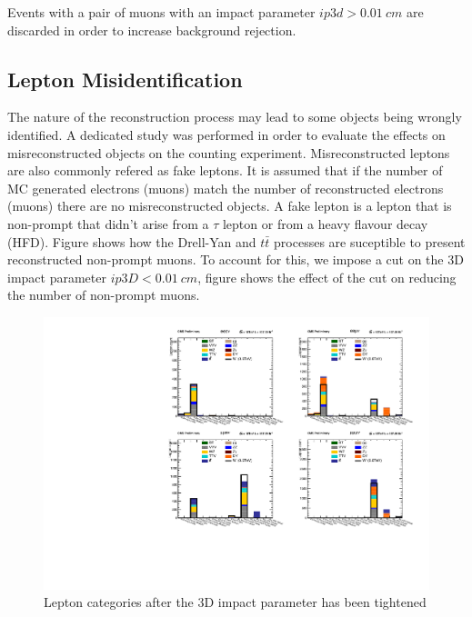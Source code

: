 Events with a pair of muons with an impact parameter $ip3d>0.01~cm$ are
discarded in order to increase background rejection.

\subsection{Lepton Misidentification}

The nature of the reconstruction process may lead to some objects being
wrongly identified. A dedicated study was performed in order to evaluate
the effects on misreconstructed objects on the counting experiment.
Misreconstructed leptons are also commonly refered as fake leptons. It
is assumed that if the number of MC generated electrons (muons) match
the number of reconstructed electrons (muons) there are no misreconstructed
objects. A fake lepton is a lepton that is non-prompt that didn't arise from
a $\tau$ lepton or from a heavy flavour decay (HFD). Figure %
shows how the Drell-Yan and $t\bar{t}$ processes are suceptible to present
reconstructed non-prompt muons. To account for this, we impose a cut on the
3D impact parameter $ip3D<0.01~cm$, figure %
shows the effect of the cut on reducing the number of non-prompt muons.


\begin{figure}[tph]
  \centering
  \includegraphics[width=\textwidth]{fig/Run2/Rebining_HFakeString_SR1_A_RuRun2_M600.pdf}
  \caption{Lepton categories after the 3D impact parameter has been tightened}
  \label{fig:HFakeString_AfterIp3DCut}
\end{figure}







